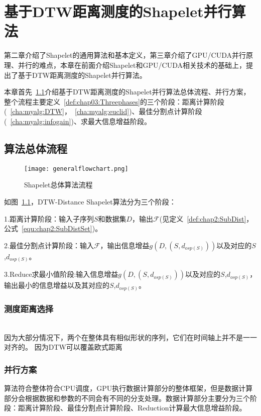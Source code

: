 \chapter{基于DTW距离测度的Shapelet并行算法}
\label{cha:myalg}

第二章介绍了Shapelet的通用算法和基本定义，第三章介绍了GPU/CUDA并行原理、并行的难点，本章在前面介绍Shapelet和GPU/CUDA相关技术的基础上，提出了基于DTW距离测度的Shapelet并行算法。

本章首先~\ref{cha:myalg:Overview}介绍基于DTW距离测度的Shapelet并行算法总体流程、并行方案，整个流程主要定义~\ref{def:chap03:Threephases}的三个阶段：距离计算阶段(~\ref{cha:myalg:DTW}，~\ref{cha:myalg:euclid})、最佳分割点计算阶段(~\ref{cha:myalg:infogain})、求最大信息增益阶段。

\section{算法总体流程}
\label{cha:myalg:Overview}

{\color{red}{如果更改几个框的名字,也需要改这一块,底下标题要改,Reduce求最小值也要改}}


\begin{figure}[H] %
	\centering
	\texttt{[image: generalflowchart.png]}
	\caption{Shapelet总体算法流程}
	\label{fig:generalflow}
\end{figure}
如图~\ref{fig:generalflow}，DTW-Distance Shapelet算法分为三个阶段：

1.距离计算阶段：输入子序列$S$和数据集$D$，输出$\mathcal{F}$(见定义~\ref{def:chap2:SubDist}，公式~\ref{equ:chap2:SubDistSet})。 

2.最佳分割点计算阶段：输入$\mathcal{F}$，输出信息增益$g(D,(S,d_{osp(S)}))$以及对应的$S$,$d_{osp(S)}$。

3.Reduce求最小值阶段:输入信息增益$g(D,(S,d_{osp(S)}))$以及对应的$S$,$d_{osp(S)}$，输出最小的信息增益以及其对应的$S$,$d_{osp(S)}$。
\subsection{测度距离选择}
{\color{red}{需要在这里叙述一下$w$变化的优点,也就是为什么采用$w$测度}} \\
因为大部分情况下，两个在整体具有相似形状的序列，它们在时间轴上并不是一一对齐的。
因为DTW可以覆盖欧式距离

\subsection{并行方案}
算法符合整体符合CPU调度，GPU执行数据计算部分的整体框架，但是数据计算部分会根据数据和参数的不同会有不同的分支处理。数据计算部分主要分为三个阶段：距离计算阶段、最佳分割点计算阶段、Reduction计算最大信息增益阶段。

